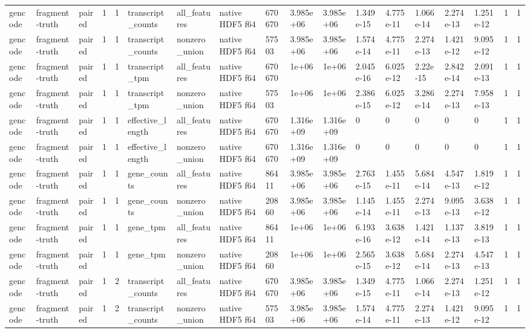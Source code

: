 \begin{tabular}{llllllllllllllllll}
gencode & fragment-truth & paired & 1 & 1 & transcript\_counts & all\_features & native HDF5 f64 & 670670 & 3.985e+06 & 3.985e+06 & 1.349e-15 & 4.775e-11 & 1.066e-14 & 2.274e-13 & 1.251e-12 & 1 & 1 \\
gencode & fragment-truth & paired & 1 & 1 & transcript\_counts & nonzero\_union & native HDF5 f64 & 57503 & 3.985e+06 & 3.985e+06 & 1.574e-14 & 4.775e-11 & 2.274e-13 & 1.421e-12 & 9.095e-12 & 1 & 1 \\
gencode & fragment-truth & paired & 1 & 1 & transcript\_tpm & all\_features & native HDF5 f64 & 670670 & 1e+06 & 1e+06 & 2.045e-16 & 6.025e-12 & 2.22e-15 & 2.842e-14 & 2.091e-13 & 1 & 1 \\
gencode & fragment-truth & paired & 1 & 1 & transcript\_tpm & nonzero\_union & native HDF5 f64 & 57503 & 1e+06 & 1e+06 & 2.386e-15 & 6.025e-12 & 3.286e-14 & 2.274e-13 & 7.958e-13 & 1 & 1 \\
gencode & fragment-truth & paired & 1 & 1 & effective\_length & all\_features & native HDF5 f64 & 670670 & 1.316e+09 & 1.316e+09 & 0 & 0 & 0 & 0 & 0 & 1 & 1 \\
gencode & fragment-truth & paired & 1 & 1 & effective\_length & nonzero\_union & native HDF5 f64 & 670670 & 1.316e+09 & 1.316e+09 & 0 & 0 & 0 & 0 & 0 & 1 & 1 \\
gencode & fragment-truth & paired & 1 & 1 & gene\_counts & all\_features & native HDF5 f64 & 86411 & 3.985e+06 & 3.985e+06 & 2.763e-15 & 1.455e-11 & 5.684e-14 & 4.547e-13 & 1.819e-12 & 1 & 1 \\
gencode & fragment-truth & paired & 1 & 1 & gene\_counts & nonzero\_union & native HDF5 f64 & 20860 & 3.985e+06 & 3.985e+06 & 1.145e-14 & 1.455e-11 & 2.274e-13 & 9.095e-13 & 3.638e-12 & 1 & 1 \\
gencode & fragment-truth & paired & 1 & 1 & gene\_tpm & all\_features & native HDF5 f64 & 86411 & 1e+06 & 1e+06 & 6.193e-16 & 3.638e-12 & 1.421e-14 & 1.137e-13 & 3.819e-13 & 1 & 1 \\
gencode & fragment-truth & paired & 1 & 1 & gene\_tpm & nonzero\_union & native HDF5 f64 & 20860 & 1e+06 & 1e+06 & 2.565e-15 & 3.638e-12 & 5.684e-14 & 2.274e-13 & 4.547e-13 & 1 & 1 \\
gencode & fragment-truth & paired & 1 & 2 & transcript\_counts & all\_features & native HDF5 f64 & 670670 & 3.985e+06 & 3.985e+06 & 1.349e-15 & 4.775e-11 & 1.066e-14 & 2.274e-13 & 1.251e-12 & 1 & 1 \\
gencode & fragment-truth & paired & 1 & 2 & transcript\_counts & nonzero\_union & native HDF5 f64 & 57503 & 3.985e+06 & 3.985e+06 & 1.574e-14 & 4.775e-11 & 2.274e-13 & 1.421e-12 & 9.095e-12 & 1 & 1 \\

\end{tabular}
